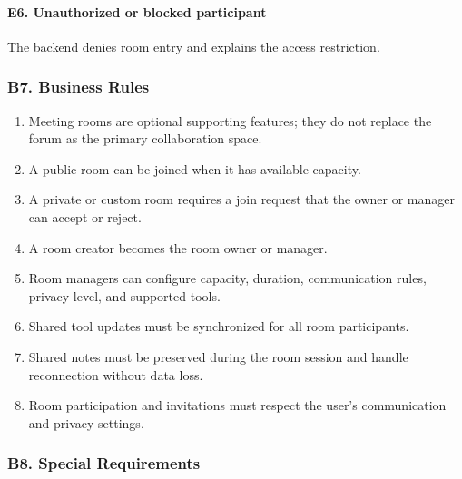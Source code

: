 \documentclass[12pt]{article}
\begin{document}
\hypertarget{sec:e6-unauthorized-or-blocked-participant}{}
\paragraph*{E6. Unauthorized or blocked participant}
\par\medskip

The backend denies room entry and explains the access restriction.
\par\medskip

\hypertarget{sec:b7-business-rules}{}
\subsubsection*{B7. Business Rules}
\par\medskip

\begin{enumerate}
\item Meeting rooms are optional supporting features; they do not replace the forum as the primary collaboration space.
\item A public room can be joined when it has available capacity.
\item A private or custom room requires a join request that the owner or manager can accept or reject.
\item A room creator becomes the room owner or manager.
\item Room managers can configure capacity, duration, communication rules, privacy level, and supported tools.
\item Shared tool updates must be synchronized for all room participants.
\item Shared notes must be preserved during the room session and handle reconnection without data loss.
\item Room participation and invitations must respect the user's communication and privacy settings.
\end{enumerate}
\par\medskip

\hypertarget{sec:b8-special-requirements}{}
\subsubsection*{B8. Special Requirements}
\par\medskip
\end{document}
